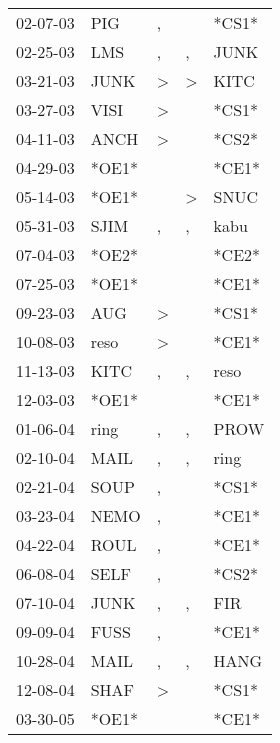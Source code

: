 \begin{supertabular}{lllll}
 02-07-03 &    PIG &                , &               &  *CS1* \\
 02-25-03 &    LMS &                , &             , &   JUNK \\
 03-21-03 &   JUNK &     \textgreater &  \textgreater &   KITC \\
 03-27-03 &   VISI &     \textgreater &               &  *CS1* \\
 04-11-03 &   ANCH &     \textgreater &               &  *CS2* \\
 04-29-03 &  *OE1* &                  &               &  *CE1* \\
 05-14-03 &  *OE1* &                  &  \textgreater &   SNUC \\
 05-31-03 &   SJIM &                , &             , &   kabu \\
 07-04-03 &  *OE2* &                  &               &  *CE2* \\
 07-25-03 &  *OE1* &                  &               &  *CE1* \\
 09-23-03 &    AUG &     \textgreater &               &  *CS1* \\
 10-08-03 &   reso &     \textgreater &               &  *CE1* \\
 11-13-03 &   KITC &                , &             , &   reso \\
 12-03-03 &  *OE1* &                  &               &  *CE1* \\
 01-06-04 &   ring &                , &             , &   PROW \\
 02-10-04 &   MAIL &                , &             , &   ring \\
 02-21-04 &   SOUP &                , &               &  *CS1* \\
 03-23-04 &   NEMO &                , &               &  *CE1* \\
 04-22-04 &   ROUL &                , &               &  *CE1* \\
 06-08-04 &   SELF &                , &               &  *CS2* \\
 07-10-04 &   JUNK &                , &             , &    FIR \\
 09-09-04 &   FUSS &                , &               &  *CE1* \\
 10-28-04 &   MAIL &                , &             , &   HANG \\
 12-08-04 &   SHAF &     \textgreater &               &  *CS1* \\
 03-30-05 &  *OE1* &                  &               &  *CE1* \\

\end{supertabular}
